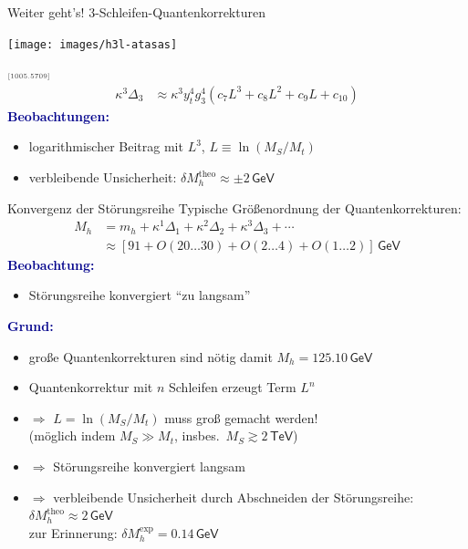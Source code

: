 \documentclass[hyperref={pdfpagelabels=false},ngerman]{beamer}
\newcommand{\eh}[1]{\,\mathsf{#1}}
\newcommand{\MS}{\ensuremath{M_S}}
\newcommand{\mycite}[1]{\ensuremath{\text{\textcolor{darkgray}{\tiny [#1]}}}}
\renewcommand{\emph}[1]{\textbf{\textcolor{darkblue}{#1}}}
\newcommand{\GeV}{\eh{GeV}}
\newcommand{\TeV}{\eh{TeV}}
\begin{document}
\begin{frame}{Weiter geht's! 3-Schleifen-Quantenkorrekturen}
  \begin{center}
    \texttt{[image: images/h3l-atasas]}
  \end{center}
  \mycite{1005.5709}
  \begin{align*}
    \kappa^3\Delta_3 &\approx
    \kappa^3 y_t^4 g_3^4 \left(
      c_7 L^3
      + c_8 L^2
      + c_9 L
      + c_{10}
    \right)
  \end{align*}
  \emph{Beobachtungen:}
  \begin{itemize}
  \item logarithmischer Beitrag mit $L^3$, $L\equiv\ln(\MS / M_t)$
  \item verbleibende Unsicherheit: $\delta M_h^{\text{theo}} \approx \pm 2 \GeV$
  \end{itemize}
\end{frame}

\begin{frame}{Konvergenz der Störungsreihe}
  Typische Größenordnung der Quantenkorrekturen:
  \begin{align*}
    M_h &= m_h + \kappa^1\Delta_1 + \kappa^2\Delta_2 + \kappa^3\Delta_3 + \cdots \\
    &\approx [91 + O(20\ldots 30) + O(2\ldots 4) + O(1\ldots 2)] \GeV
  \end{align*}
  \emph{Beobachtung:}
  \begin{itemize}
  \item Störungsreihe konvergiert ``zu langsam''
  \end{itemize}
  \emph{Grund:}
  \begin{itemize}
  \item große Quantenkorrekturen sind nötig damit $M_h = 125.10\GeV$
  \item Quantenkorrektur mit $n$ Schleifen erzeugt Term $L^n$
  \item $\Rightarrow$ $L=\ln(\MS / M_t)$ muss groß gemacht werden!\\
    (möglich indem $\MS \gg M_t$, insbes.\ $\MS \gtrsim 2\TeV$)
  \item $\Rightarrow$ Störungsreihe konvergiert langsam
  \item $\Rightarrow$ verbleibende Unsicherheit durch Abschneiden der
    Störungsreihe: $\delta M_h^{\text{theo}} \approx 2\GeV$ \\
    zur Erinnerung: $\delta M_h^{\text{exp}} = 0.14\GeV$
  \end{itemize}
\end{frame}
\end{document}
